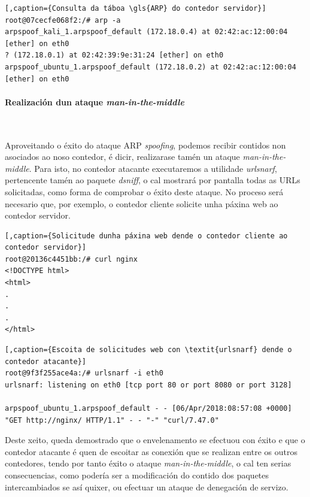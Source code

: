 \begin{enumerate}
\begin{lstlisting}[,caption={Consulta da táboa \gls{ARP} do contedor servidor}]
root@07cecfe068f2:/# arp -a
arpspoof_kali_1.arpspoof_default (172.18.0.4) at 02:42:ac:12:00:04 [ether] on eth0
? (172.18.0.1) at 02:42:39:9e:31:24 [ether] on eth0
arpspoof_ubuntu_1.arpspoof_default (172.18.0.2) at 02:42:ac:12:00:04 [ether] on eth0
\end{lstlisting}

\paragraph{Realización dun ataque \textit{man-in-the-middle}}~~

Aproveitando o éxito do ataque \gls{ARP} \textit{spoofing}, podemos recibir contidos non asociados ao noso contedor, é dicir, realizarase tamén un ataque \textit{man-in-the-middle}. Para isto, no contedor atacante executaremos a utilidade \textit{urlsnarf}, pertencente tamén ao paquete \textit{dsniff}, o cal mostrará por pantalla todas as URLs solicitadas, como forma de comprobar o éxito deste ataque. No proceso será necesario que, por exemplo, o contedor cliente solicite unha páxina web ao contedor servidor.

\begin{lstlisting}[,caption={Solicitude dunha páxina web dende o contedor cliente ao contedor servidor}]
root@20136c4451bb:/# curl nginx
<!DOCTYPE html>
<html>
.
.
.
</html>
\end{lstlisting}

\begin{lstlisting}[,caption={Escoita de solicitudes web con \textit{urlsnarf} dende o contedor atacante}]
root@9f3f255ace4a:/# urlsnarf -i eth0
urlsnarf: listening on eth0 [tcp port 80 or port 8080 or port 3128]

arpspoof_ubuntu_1.arpspoof_default - - [06/Apr/2018:08:57:08 +0000] "GET http://nginx/ HTTP/1.1" - - "-" "curl/7.47.0"
\end{lstlisting}

Deste xeito, queda demostrado que o envelenamento se efectuou con éxito e que o contedor atacante é quen de escoitar as conexión que se realizan entre os outros contedores, tendo por tanto éxito o ataque \textit{man-in-the-middle}, o cal ten serias consecuencias, como podería ser a modificación do contido dos paquetes intercambiados se así quixer, ou efectuar un ataque de denegación de servizo.

\end{enumerate}

